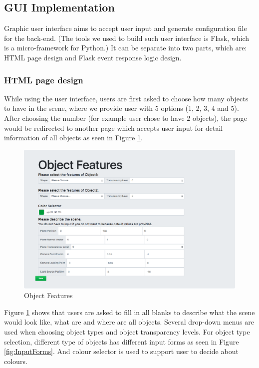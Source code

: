 \documentclass[a4paper, 12pt]{article}
\begin{document}
\subsection{GUI Implementation}
Graphic user interface aims to accept user input and generate configuration file for the back-end. (The tools we used to build such user interface is Flask, which is a micro-framework for Python.) It can be separate into two parts, which are: HTML page design and Flask event response logic design. 

\subsubsection{HTML page design}
While using the user interface, users are first asked to choose how many objects to have in the scene, where we provide user with 5 options (1, 2, 3, 4 and 5). After choosing the number (for example user chose to have 2 objects), the page would be redirected to another page which accepts user input for detail information of all objects as seen in Figure \ref{fig:ObjectFeatures}.

\begin{figure}[H]
\centering
\includegraphics[width=\linewidth]{GUI_Figure1.png}
\caption{Object Features}
\label{fig:ObjectFeatures}
\end{figure}

Figure \ref{fig:ObjectFeatures} shows that users are asked to fill in all blanks to describe what the scene would look like, what are and where are all objects. Several drop-down menus are used when choosing object types and object transparency levels. For object type selection, different type of objects has different input forms as seen in Figure \ref{fig:InputForms}. And colour selector is used to support user to decide about colours. 
\end{document}
